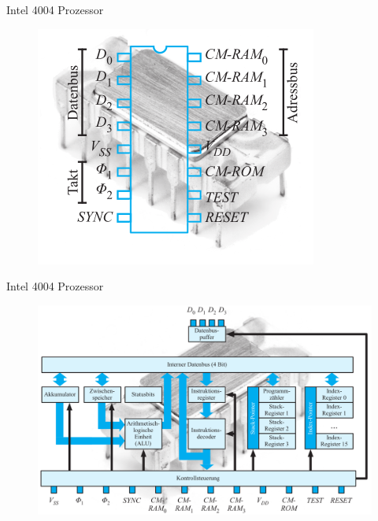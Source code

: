 \documentclass[12pt%
,aspectratio=169%
]{beamer}
\begin{document}
\begin{frame}{Intel 4004 Prozessor}
\begin{figure}
\center
\includegraphics[scale=0.7]{pictures/4004}
\end{figure}
\end{frame}

\begin{frame}{Intel 4004 Prozessor}
\begin{figure}
\center
\includegraphics[scale=0.25]{pictures/4004_2}
\end{figure}
\end{frame}
\end{document}
